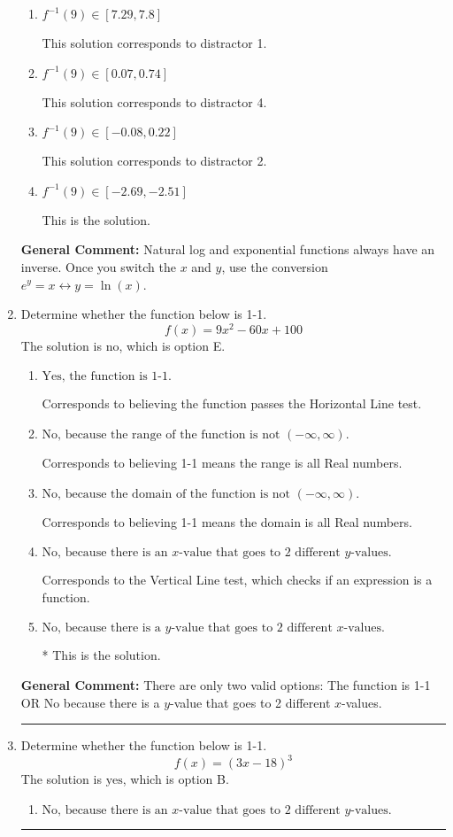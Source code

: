\documentclass{extbook}[14pt]
\newcommand{\litem}[1]{\item #1

\rule{\textwidth}{0.4pt}}
\begin{document}
\begin{enumerate}
{\begin{enumerate}[label=\Alph*.]
 This solution corresponds to distractor 3.
\item \( f^{-1}(9) \in [7.29, 7.8] \)

 This solution corresponds to distractor 1.
\item \( f^{-1}(9) \in [0.07, 0.74] \)

 This solution corresponds to distractor 4.
\item \( f^{-1}(9) \in [-0.08, 0.22] \)

 This solution corresponds to distractor 2.
\item \( f^{-1}(9) \in [-2.69, -2.51] \)

 This is the solution.
\end{enumerate}

\textbf{General Comment:} Natural log and exponential functions always have an inverse. Once you switch the $x$ and $y$, use the conversion $ e^y = x \leftrightarrow y=\ln(x)$.
}
\litem{
Determine whether the function below is 1-1.
\[ f(x) = 9 x^2 - 60 x + 100 \]The solution is \( \text{no} \), which is option E.\begin{enumerate}[label=\Alph*.]
\item \( \text{Yes, the function is 1-1.} \)

Corresponds to believing the function passes the Horizontal Line test.
\item \( \text{No, because the range of the function is not $(-\infty, \infty)$.} \)

Corresponds to believing 1-1 means the range is all Real numbers.
\item \( \text{No, because the domain of the function is not $(-\infty, \infty)$.} \)

Corresponds to believing 1-1 means the domain is all Real numbers.
\item \( \text{No, because there is an $x$-value that goes to 2 different $y$-values.} \)

Corresponds to the Vertical Line test, which checks if an expression is a function.
\item \( \text{No, because there is a $y$-value that goes to 2 different $x$-values.} \)

* This is the solution.
\end{enumerate}

\textbf{General Comment:} There are only two valid options: The function is 1-1 OR No because there is a $y$-value that goes to 2 different $x$-values.
}
\litem{
Determine whether the function below is 1-1.
\[ f(x) = (3 x - 18)^3 \]The solution is \( \text{yes} \), which is option B.\begin{enumerate}[label=\Alph*.]
\item \( \text{No, because there is an $x$-value that goes to 2 different $y$-values.} \)


\end{enumerate}}
\end{enumerate}
\end{document}
